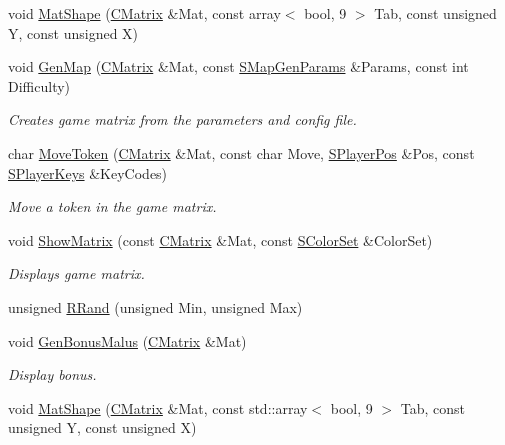\begin{DoxyCompactItemize}
void \hyperlink{namespace_chase_game_ac12626138d0e2c49669eba73ffb4e4b7}{Mat\-Shape} (\hyperlink{namespace_chase_game_a469449f9237e59efce3982127366c550}{C\-Matrix} \&Mat, const array$<$ bool, 9 $>$ Tab, const unsigned Y, const unsigned X)
\item 
void \hyperlink{namespace_chase_game_a15617c8a111cd66bf5d24fd1e82a119d}{Gen\-Map} (\hyperlink{namespace_chase_game_a469449f9237e59efce3982127366c550}{C\-Matrix} \&Mat, const \hyperlink{struct_chase_game_1_1_s_map_gen_params}{S\-Map\-Gen\-Params} \&Params, const int Difficulty)
\begin{DoxyCompactList}\small\item\em Creates game matrix from the parameters and config file. \end{DoxyCompactList}\item 
char \hyperlink{namespace_chase_game_a1dfe4bdbd50ee18cf85760219ea90b03}{Move\-Token} (\hyperlink{namespace_chase_game_a469449f9237e59efce3982127366c550}{C\-Matrix} \&Mat, const char Move, \hyperlink{struct_chase_game_1_1_s_player_pos}{S\-Player\-Pos} \&Pos, const \hyperlink{struct_chase_game_1_1_s_player_keys}{S\-Player\-Keys} \&Key\-Codes)
\begin{DoxyCompactList}\small\item\em Move a token in the game matrix. \end{DoxyCompactList}\item 
void \hyperlink{namespace_chase_game_a871395f1f12e55eaa3d341b8ef2cbb78}{Show\-Matrix} (const \hyperlink{namespace_chase_game_a469449f9237e59efce3982127366c550}{C\-Matrix} \&Mat, const \hyperlink{struct_chase_game_1_1_s_color_set}{S\-Color\-Set} \&Color\-Set)
\begin{DoxyCompactList}\small\item\em Displays game matrix. \end{DoxyCompactList}\item 
unsigned \hyperlink{namespace_chase_game_aee2df7cbf4974e167612a7415943f3b0}{R\-Rand} (unsigned Min, unsigned Max)
\item 
void \hyperlink{namespace_chase_game_a6351b2bdc824272990926fbb8e8ad359}{Gen\-Bonus\-Malus} (\hyperlink{namespace_chase_game_a469449f9237e59efce3982127366c550}{C\-Matrix} \&Mat)
\begin{DoxyCompactList}\small\item\em Display bonus. \end{DoxyCompactList}\item 
void \hyperlink{namespace_chase_game_a049d8d8beb22431889ca7ba34cc90871}{Mat\-Shape} (\hyperlink{namespace_chase_game_a469449f9237e59efce3982127366c550}{C\-Matrix} \&Mat, const std\-::array$<$ bool, 9 $>$ Tab, const unsigned Y, const unsigned X)

\end{DoxyCompactItemize}
